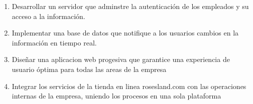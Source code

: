 \begin{enumerate}
\item Desarrollar un servidor que adminstre la autenticación de los empleados y su acceso a la información.
\item Implementar una base de datos que notifique a los usuarios cambios en la información en tiempo real.
\item Diseñar una aplicacion web progesiva que garantice una experiencia de usuario óptima para todas las areas de la empresa
\item Integrar los servicios de la tienda en linea rosesland.com con las operaciones internas de la empresa, uniendo los procesos en una sola plataforma
\end{enumerate}